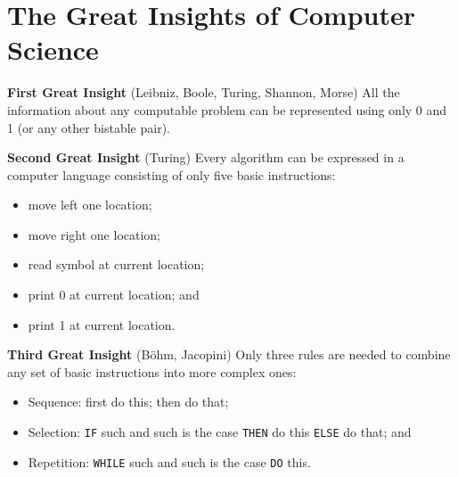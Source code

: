 \documentclass[8pt,a4paper,compress]{beamer}
\begin{document}
\section{The Great Insights of Computer Science}
\begin{frame}[fragile]
\pause
\textbf{First Great Insight} (Leibniz, Boole, Turing, Shannon, Morse) All the information about any computable problem can be represented using only 0 and 1 (or any other bistable pair).

\pause
\smallskip

\textbf{Second Great Insight} (Turing) Every algorithm can be expressed in a computer language consisting of only five basic instructions:
\begin{itemize}
\item move left one location; 
\item move right one location; 
\item read symbol at current location; 
\item print 0 at current location; and 
\item print 1 at current location.
\end{itemize}

\pause
\smallskip

\textbf{Third Great Insight} (B\"{o}hm, Jacopini) Only three rules are needed to combine any set of basic instructions into more complex ones: 
\begin{itemize}
\item Sequence: first do this; then do that; 
\item Selection: \texttt{IF} such and such is the case \texttt{THEN} do this \texttt{ELSE} do that; and 
\item Repetition: \texttt{WHILE} such and such is the case \texttt{DO} this.
\end{itemize}
\end{frame}
\end{document}
